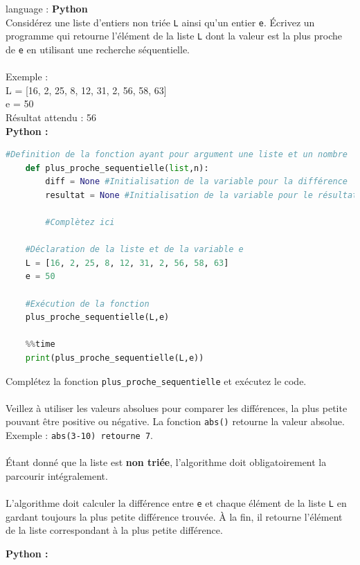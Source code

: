 \begin{Exercice}[10 minutes] language : \textbf{Python}\\

Considérez une liste d’entiers non triée \lstinline{L} ainsi qu’un entier \lstinline{e}. Écrivez un programme qui retourne l'élément de la liste \lstinline{L} dont la valeur est la plus proche de \lstinline{e} en utilisant une recherche séquentielle.\\\\
Exemple :\\
L = [16, 2, 25, 8, 12, 31, 2, 56, 58, 63]\\
e = 50\\
Résultat attendu : 56\\
\textbf{Python :}
    \begin{lstlisting}[language=Python]
    #Definition de la fonction ayant pour argument une liste et un nombre 
    def plus_proche_sequentielle(list,n):
        diff = None #Initialisation de la variable pour la différence
        resultat = None #Initialisation de la variable pour le résultat
    
        #Complètez ici
        
    #Déclaration de la liste et de la variable e
    L = [16, 2, 25, 8, 12, 31, 2, 56, 58, 63] 
    e = 50

    #Exécution de la fonction
    plus_proche_sequentielle(L,e)
    
    %%time 
    print(plus_proche_sequentielle(L,e))

    \end{lstlisting}

    \begin{conseil}
        Complétez la fonction \lstinline{plus_proche_sequentielle} et exécutez le code.\\\\
        Veillez à utiliser les valeurs absolues pour comparer les différences, la plus petite pouvant être positive ou négative. La fonction \lstinline{abs()} retourne la valeur absolue. Exemple : \lstinline{abs(3-10) retourne 7}.\\\\
        Étant donné que la liste est \textbf{non triée}, l'algorithme doit obligatoirement la parcourir intégralement.\\\\
        L'algorithme doit calculer la différence entre \lstinline{e} et chaque élément de la liste \lstinline{L} en gardant toujours la plus petite différence trouvée. À la fin, il retourne l'élément de la liste correspondant à la plus petite différence.  
    \end{conseil}
    
    \begin{solution}
    \textbf{Python :}
        
        
    \end{solution}
    
\end{Exercice}

